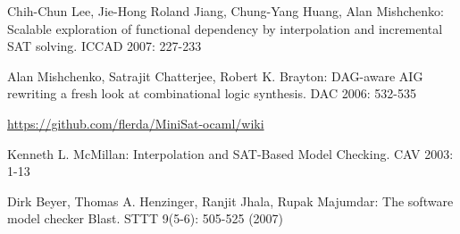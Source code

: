 \documentclass[runningheads,a4paper]{llncs}
\begin{document}
\begin{thebibliography}{4}
Chih-Chun Lee, Jie-Hong Roland Jiang, Chung-Yang Huang, Alan Mishchenko: Scalable exploration of functional dependency by interpolation and incremental SAT solving. ICCAD 2007: 227-233

Alan Mishchenko, Satrajit Chatterjee, Robert K. Brayton: DAG-aware AIG rewriting a fresh look at combinational logic synthesis. DAC 2006: 532-535

\url{https://github.com/flerda/MiniSat-ocaml/wiki}













Kenneth L. McMillan: Interpolation and SAT-Based Model Checking. CAV 2003: 1-13

Dirk Beyer, Thomas A. Henzinger, Ranjit Jhala, Rupak Majumdar: The software model checker Blast. STTT 9(5-6): 505-525 (2007)





\end{thebibliography}
\end{document}
